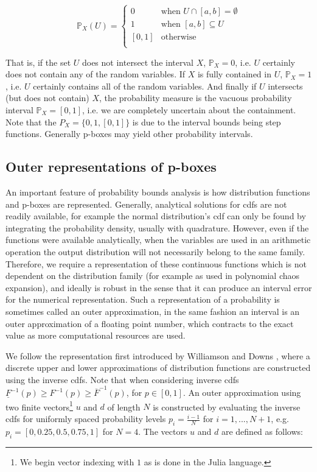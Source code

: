 \documentclass{juliacon}
\begin{document}
\begin{equation*}
  \mathbb{P}_{X}(U) = \begin{cases}
    0 & \text{when } U \cap [a,b] = \emptyset \\
    1 & \text{when } [a,b] \subseteq U  \\
    [0, 1] & \text{otherwise }\\
  \end{cases}
\end{equation*}

\noindent That is, if the set $U$ does not intersect the interval $X$, $\mathbb{P}_{X}=0$, i.e. $U$ certainly does not contain any of the random variables. If $X$ is fully contained in $U$, $\mathbb{P}_{X}=1$, i.e. $U$ certainly contains all of the random variables. And finally if $U$ intersects (but does not contain) $X$, the probability measure is the vacuous probability interval $\mathbb{P}_{X} = [0, 1]$, i.e. we are completely uncertain about the containment. Note that the $P_{X} = \{0, 1, [0,1]\}$ is due to the interval bounds being step functions. Generally p-boxes may yield other probability intervals.

\subsection{Outer representations of p-boxes}
\label{sec:outer_approx}

An important feature of probability bounds analysis is how distribution functions and p-boxes are represented. Generally, analytical solutions for cdfs are not readily available, for example the normal distribution's cdf can only be found by integrating the probability density, usually with quadrature. However, even if the functions were available analytically, when the variables are used in an arithmetic operation the output distribution will not necessarily belong to the same family. Therefore, we require a representation of these continuous functions which is not dependent on the distribution family (for example as used in polynomial chaos expansion), and ideally is robust in the sense that it can produce an interval error for the numerical representation. Such a representation of a probability is sometimes called an outer approximation, in the same fashion an interval is an outer approximation of a floating point number, which contracts to the exact value as more computational resources are used.

We follow the representation first introduced by Williamson and Downs \cite{williamson1990probabilistic}, where a discrete upper and lower approximations of distribution functions are constructed using the inverse cdfs. Note that when considering inverse cdfs $\underline{F}^{-1}(p) \geq F^{-1}(p) \geq \overline{F}^{-1}(p)$, for $p \in [0,1]$. An outer approximation using two finite vectors\footnote{We begin vector indexing with $1$ as is done in the Julia language.} $u$ and $d$ of length $N$ is constructed by evaluating the inverse cdfs for uniformly spaced probability levels $p_{i} = \frac{i-1}{N}$ for $i = 1, ... , N+1$, e.g. $p_{i} = [0, 0.25, 0.5, 0.75, 1]$ for $N = 4$. The vectors $u$ and $d$ are defined as follows:
\end{document}
